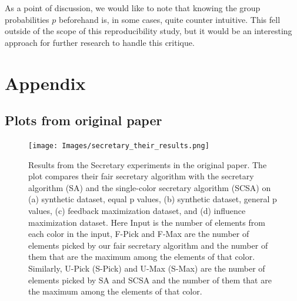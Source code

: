 As a point of discussion, we would like to note that knowing the group probabilities $p$ beforehand is, in some cases, quite counter intuitive. This fell outside of the scope of this reproducibility study, but it would be an interesting approach for further research to handle this critique.




\newpage




\section*{Appendix}

\subsection{Plots from original paper}

\begin{figure}[H]
    \texttt{[image: Images/secretary\_their\_results.png]}
    \caption{Results from the Secretary experiments in the original paper. The plot compares their fair secretary algorithm with the secretary algorithm (SA) and the single-color secretary algorithm (SCSA) on (a) synthetic dataset, equal p values, (b) synthetic dataset, general p values, (c) feedback maximization dataset, and (d) influence maximization dataset. Here Input is the number of elements from each color in the input, F-Pick and F-Max are the number of elements picked by our fair secretary algorithm and the number of them that are the maximum among the elements of that color. Similarly, U-Pick (S-Pick) and U-Max (S-Max) are the number of elements picked by SA and SCSA and the number of them that are the maximum among the elements of that color.}
    \label{fig:secretary_original_results}
\end{figure}

